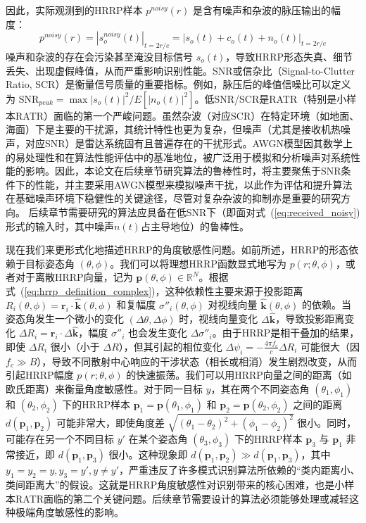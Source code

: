 因此，实际观测到的HRRP样本 $p^{noisy}(r)$ 是含有噪声和杂波的脉压输出的幅度：
\begin{equation}
    p^{noisy}(r) = |s_o^{noisy}(t)|_{t=2r/c} = |s_o(t) + c_o(t) + n_o(t)|_{t=2r/c}
    \label{eq:hrrp_noisy}
\end{equation}
噪声和杂波的存在会污染甚至淹没目标信号 $s_o(t)$，导致HRRP形态失真、细节丢失、出现虚假峰值，从而严重影响识别性能。SNR或信杂比（Signal-to-Clutter Ratio, SCR）是衡量信号质量的重要指标。例如，脉压后的峰值信噪比可以定义为 $\text{SNR}_{peak} = \max |s_o(t)|^2 / E[|n_o(t)|^2]$。低SNR/SCR是RATR（特别是小样本RATR）面临的第一个严峻问题。虽然杂波（对应SCR）在特定环境（如地面、海面）下是主要的干扰源，其统计特性也更为复杂，但噪声（尤其是接收机热噪声，对应SNR）是雷达系统固有且普遍存在的干扰形式。AWGN模型因其数学上的易处理性和在算法性能评估中的基准地位，被广泛用于模拟和分析噪声对系统性能的影响。因此，本论文在后续章节研究算法的鲁棒性时，将主要聚焦于SNR条件下的性能，并主要采用AWGN模型来模拟噪声干扰，以此作为评估和提升算法在基础噪声环境下稳健性的关键途径，尽管对复杂杂波的抑制亦是重要的研究方向。 后续章节需要研究的算法应具备在低SNR下（即面对式~(\ref{eq:received_noisy})形式的输入时，其中噪声$n(t)$占主导地位）的鲁棒性。


现在我们来更形式化地描述HRRP的角度敏感性问题。如前所述，HRRP的形态依赖于目标姿态角 $(\theta, \phi)$。我们可以将理想HRRP函数显式地写为 $p(r; \theta, \phi)$，或者对于离散HRRP向量，记为 $\mathbf{p}(\theta, \phi) \in \mathbb{R}^N$。根据式~(\ref{eq:hrrp_definition_complex})，这种依赖性主要来源于投影距离 $R_i(\theta, \phi) = \mathbf{r}_i \cdot \hat{\mathbf{k}}(\theta, \phi)$ 和复幅度 $\sigma''_i(\theta, \phi)$ 对视线向量 $\hat{\mathbf{k}}(\theta, \phi)$ 的依赖。当姿态角发生一个微小的变化 $(\Delta\theta, \Delta\phi)$ 时，视线向量变化 $\Delta\hat{\mathbf{k}}$，导致投影距离变化 $\Delta R_i = \mathbf{r}_i \cdot \Delta\hat{\mathbf{k}}$，幅度 $\sigma''_i$ 也会发生变化 $\Delta\sigma''_i$。由于HRRP是相干叠加的结果，即使 $\Delta R_i$ 很小（小于 $\Delta R$），但其引起的相位变化 $\Delta\psi_i = - \frac{4\pi f_c}{c} \Delta R_i$ 可能很大（因 $f_c \gg B$），导致不同散射中心响应的干涉状态（相长或相消）发生剧烈改变，从而引起HRRP幅度 $p(r; \theta, \phi)$ 的快速振荡。我们可以用HRRP向量之间的距离（如欧氏距离）来衡量角度敏感性。对于同一目标 $y$，其在两个不同姿态角 $(\theta_1, \phi_1)$ 和 $(\theta_2, \phi_2)$ 下的HRRP样本 $\mathbf{p}_1 = \mathbf{p}(\theta_1, \phi_1)$ 和 $\mathbf{p}_2 = \mathbf{p}(\theta_2, \phi_2)$ 之间的距离 $d(\mathbf{p}_1, \mathbf{p}_2)$ 可能非常大，即使角度差 $\sqrt{(\theta_1-\theta_2)^2 + (\phi_1-\phi_2)^2}$ 很小。同时，可能存在另一个不同目标 $y'$ 在某个姿态角 $(\theta_3, \phi_3)$ 下的HRRP样本 $\mathbf{p}_3$ 与 $\mathbf{p}_1$ 非常接近，即 $d(\mathbf{p}_1, \mathbf{p}_3)$ 很小。这种现象即 $d(\mathbf{p}_1, \mathbf{p}_2) \gg d(\mathbf{p}_1, \mathbf{p}_3)$，其中 $y_1=y_2=y, y_3=y', y \neq y'$，严重违反了许多模式识别算法所依赖的“类内距离小、类间距离大”的假设。这就是HRRP角度敏感性对识别带来的核心困难，也是小样本RATR面临的第二个关键问题。后续章节需要设计的算法必须能够处理或减轻这种极端角度敏感性的影响。

